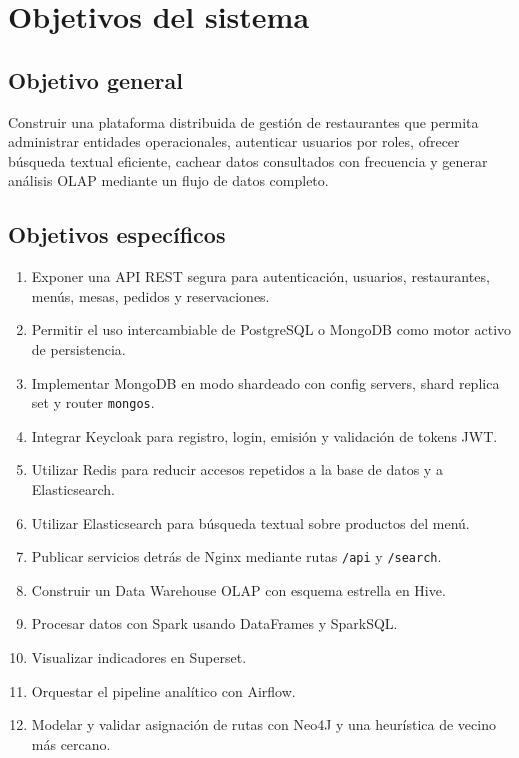 \documentclass[12pt,letterpaper]{article}
\def\codefile#1{\nolinkurl{#1}}
\begin{document}
\section{Objetivos del sistema}

\subsection{Objetivo general}

Construir una plataforma distribuida de gestión de restaurantes que permita administrar entidades operacionales, autenticar usuarios por roles, ofrecer búsqueda textual eficiente, cachear datos consultados con frecuencia y generar análisis OLAP mediante un flujo de datos completo.

\subsection{Objetivos específicos}

\begin{enumerate}
    \item Exponer una API REST segura para autenticación, usuarios, restaurantes, menús, mesas, pedidos y reservaciones.
    \item Permitir el uso intercambiable de PostgreSQL o MongoDB como motor activo de persistencia.
    \item Implementar MongoDB en modo shardeado con config servers, shard replica set y router \codefile{mongos}.
    \item Integrar Keycloak para registro, login, emisión y validación de tokens JWT.
    \item Utilizar Redis para reducir accesos repetidos a la base de datos y a Elasticsearch.
    \item Utilizar Elasticsearch para búsqueda textual sobre productos del menú.
    \item Publicar servicios detrás de Nginx mediante rutas \codefile{/api} y \codefile{/search}.
    \item Construir un Data Warehouse OLAP con esquema estrella en Hive.
    \item Procesar datos con Spark usando DataFrames y SparkSQL.
    \item Visualizar indicadores en Superset.
    \item Orquestar el pipeline analítico con Airflow.
    \item Modelar y validar asignación de rutas con Neo4J y una heurística de vecino más cercano.
\end{enumerate}
\end{document}
